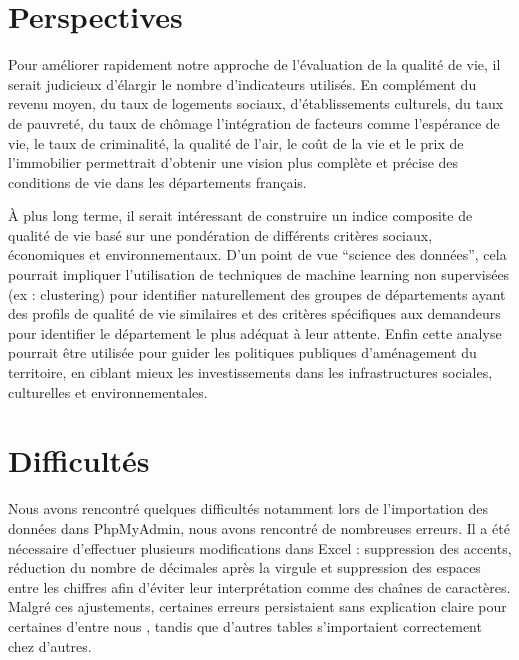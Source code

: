 \documentclass[mstat,12pt]{unswthesis}
\begin{document}
\bigskip

\section{Perspectives}\label{perspectives}

Pour améliorer rapidement notre approche de l'évaluation de la qualité
de vie, il serait judicieux d'élargir le nombre d'indicateurs utilisés.
En complément du revenu moyen, du taux de logements sociaux,
d'établissements culturels, du taux de pauvreté, du taux de chômage
l'intégration de facteurs comme l'espérance de vie, le taux de
criminalité, la qualité de l'air, le coût de la vie et le prix de
l'immobilier permettrait d'obtenir une vision plus complète et précise
des conditions de vie dans les départements français.

\bigskip

À plus long terme, il serait intéressant de construire un indice
composite de qualité de vie basé sur une pondération de différents
critères sociaux, économiques et environnementaux. D'un point de vue
``science des données'', cela pourrait impliquer l'utilisation de
techniques de machine learning non supervisées (ex : clustering) pour
identifier naturellement des groupes de départements ayant des profils
de qualité de vie similaires et des critères spécifiques aux demandeurs
pour identifier le département le plus adéquat à leur attente. Enfin
cette analyse pourrait être utilisée pour guider les politiques
publiques d'aménagement du territoire, en ciblant mieux les
investissements dans les infrastructures sociales, culturelles et
environnementales.

\section{Difficultés}\label{difficultuxe9s}

Nous avons rencontré quelques difficultés notamment lors de
l'importation des données dans PhpMyAdmin, nous avons rencontré de
nombreuses erreurs. Il a été nécessaire d'effectuer plusieurs
modifications dans Excel : suppression des accents, réduction du nombre
de décimales après la virgule et suppression des espaces entre les
chiffres afin d'éviter leur interprétation comme des chaînes de
caractères. Malgré ces ajustements, certaines erreurs persistaient sans
explication claire pour certaines d'entre nous , tandis que d'autres
tables s'importaient correctement chez d'autres.

\medskip
\end{document}
